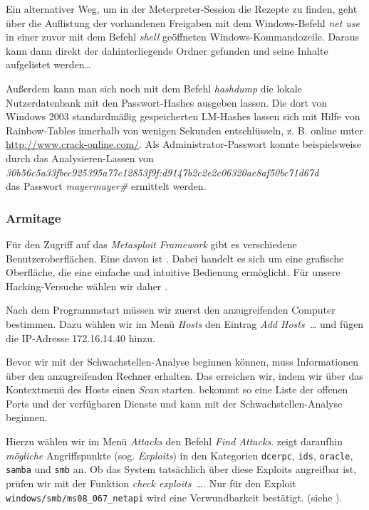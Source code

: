 Ein alternativer Weg, um in der Meterpreter-Session die Rezepte zu finden, geht
über die Auflistung der vorhandenen Freigaben mit dem Windows-Befehl \emph{net
  use} in einer zuvor mit dem Befehl \emph{shell} geöffneten
Windows-Kommandozeile. Daraus kann dann direkt der dahinterliegende Ordner
gefunden und seine Inhalte aufgelistet werden\ldots



Außerdem kann man sich noch mit dem Befehl \emph{hashdump} die lokale
Nutzerdatenbank mit den Passwort-Hashes ausgeben lassen. Die dort von Windows
2003 standardmäßig gespeicherten LM-Hashes lassen sich mit Hilfe von
Rainbow-Tables innerhalb von wenigen Sekunden entschlüsseln, z. B. online unter
\url{http://www.crack-online.com/}. Als Administrator-Passwort konnte
beispielsweise durch das Analysieren-Lassen
von\\ \emph{30b56c5a33fbec925395a77c12853f9f:d9147b2c2e2c06320ae8af50bc71d67d}\\ das
Passwort \emph{mayermayer\#} ermittelt werden.



\subsubsection{Armitage}

Für den Zugriff auf das \emph{Metasploit Framework} gibt es verschiedene
Benutzeroberflächen.  Eine davon ist \Armitage{}. Dabei handelt es sich um eine
grafische Oberfläche, die eine einfache und intuitive Bedienung ermöglicht. Für
unsere Hacking-Versuche wählen wir daher \Armitage.

Nach dem Programmstart müssen wir zuerst den anzugreifenden Computer
bestimmen. Dazu wählen wir im Menü \emph{Hosts} den Eintrag \emph{\glqq{}Add
  Hosts~\dots{}\grqq{}} und fügen die IP-Adresse 172.16.14.40 hinzu.

Bevor wir mit der Schwachstellen-Analyse beginnen können, muss \Armitage{}
Informationen über den anzugreifenden Rechner erhalten. Das erreichen wir, indem
wir über das Kontextmenü des Hosts einen \emph{Scan} starten. \Armitage{}
bekommt so eine Liste der offenen Ports und der verfügbaren Dienste und kann mit
der Schwachstellen-Analyse beginnen.

Hierzu wählen wir im Menü \emph{Attacks} den Befehl \emph{\glqq{}Find
  Attacks\grqq{}}. \Armitage{} zeigt daraufhin \emph{mögliche} Angriffspunkte
(sog. \emph{Exploits}) in den Kategorien \texttt{dcerpc}, \texttt{ids},
\texttt{oracle}, \texttt{samba} und \texttt{smb} an. Ob das System tatsächlich
über diese Exploits angreifbar ist, prüfen wir mit der Funktion
\emph{\glqq{}check exploits~\dots\grqq{}}. Nur für den Exploit
\texttt{windows/smb/ms08\_067\_netapi} wird eine Verwundbarkeit
bestätigt. (siehe ).

